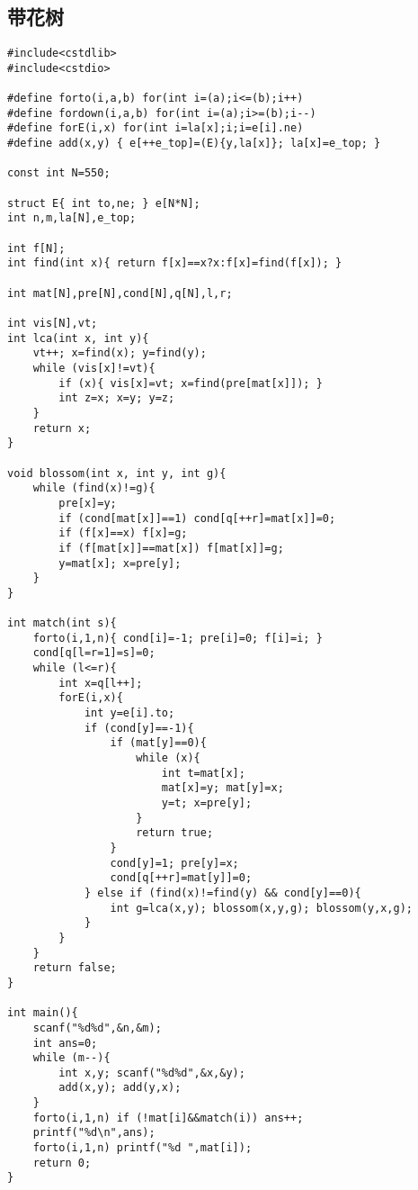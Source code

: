 \documentclass{article}
\begin{document}
\subsection{带花树}
\begin{lstlisting}
#include<cstdlib>
#include<cstdio>

#define forto(i,a,b) for(int i=(a);i<=(b);i++)
#define fordown(i,a,b) for(int i=(a);i>=(b);i--)
#define forE(i,x) for(int i=la[x];i;i=e[i].ne)
#define add(x,y) { e[++e_top]=(E){y,la[x]}; la[x]=e_top; }

const int N=550;

struct E{ int to,ne; } e[N*N];
int n,m,la[N],e_top;

int f[N];
int find(int x){ return f[x]==x?x:f[x]=find(f[x]); }

int mat[N],pre[N],cond[N],q[N],l,r;

int vis[N],vt;
int lca(int x, int y){
	vt++; x=find(x); y=find(y);
	while (vis[x]!=vt){
		if (x){ vis[x]=vt; x=find(pre[mat[x]]); }
		int z=x; x=y; y=z;
	}
	return x;
}

void blossom(int x, int y, int g){
	while (find(x)!=g){
		pre[x]=y;
		if (cond[mat[x]]==1) cond[q[++r]=mat[x]]=0;
		if (f[x]==x) f[x]=g;
		if (f[mat[x]]==mat[x]) f[mat[x]]=g;
		y=mat[x]; x=pre[y];
	}
}

int match(int s){
	forto(i,1,n){ cond[i]=-1; pre[i]=0; f[i]=i; }
	cond[q[l=r=1]=s]=0;
	while (l<=r){
		int x=q[l++];
		forE(i,x){
			int y=e[i].to;
			if (cond[y]==-1){
				if (mat[y]==0){
					while (x){
						int t=mat[x];
						mat[x]=y; mat[y]=x;
						y=t; x=pre[y];
					}
					return true;
				}
				cond[y]=1; pre[y]=x;
				cond[q[++r]=mat[y]]=0;
			} else if (find(x)!=find(y) && cond[y]==0){
				int g=lca(x,y); blossom(x,y,g); blossom(y,x,g);
			}
		}
	}
	return false;
}

int main(){
	scanf("%d%d",&n,&m);
	int ans=0;
	while (m--){
		int x,y; scanf("%d%d",&x,&y);
		add(x,y); add(y,x);
	}
	forto(i,1,n) if (!mat[i]&&match(i)) ans++;
	printf("%d\n",ans);
	forto(i,1,n) printf("%d ",mat[i]);
	return 0;
}
\end{lstlisting}
\end{document}
